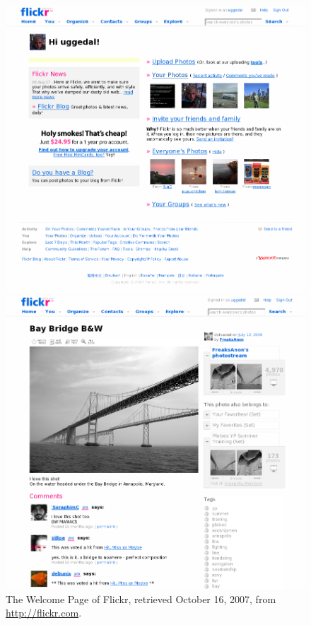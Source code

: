 \begin{figure}
  \captionstyle{\raggedright}
  \begin{whole}
    \begin{minipage}[t]{0.475\wholewidth}
      \includegraphics[width=\textwidth]{scrsh_flickr_welcome}
      \caption[Flickr Welcome Page]{%
         The Welcome Page of Flickr,
         retrieved October 16, 2007, from \url{http://flickr.com}.}
      \label{figure:scrsh.flickr.welcome}
    \end{minipage}
    \hfill
    \begin{minipage}[t]{0.475\wholewidth}
      \includegraphics[width=\textwidth]{scrsh_flickr_photo_detail}

\end{minipage}
\end{whole}
\end{figure}
